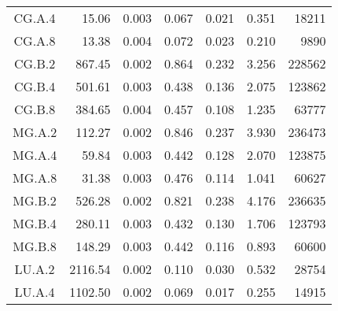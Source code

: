 \begin{longtable}[c]{c*{6}{r}}
  CG.A.4                       & 15.06                        & 0.003                        & 0.067                      & 0.021                        & 0.351 & 18211  \\
  CG.A.8                       & 13.38                        & 0.004                        & 0.072                      & 0.023                        & 0.210 & 9890   \\
  CG.B.2                       & 867.45                       & 0.002                        & 0.864                      & 0.232                        & 3.256 & 228562 \\
  CG.B.4                       & 501.61                       & 0.003                        & 0.438                      & 0.136                        & 2.075 & 123862 \\
  CG.B.8                       & 384.65                       & 0.004                        & 0.457                      & 0.108                        & 1.235 & 63777  \\
  MG.A.2                       & 112.27                       & 0.002                        & 0.846                      & 0.237                        & 3.930 & 236473 \\
  MG.A.4                       & 59.84                        & 0.003                        & 0.442                      & 0.128                        & 2.070 & 123875 \\
  MG.A.8                       & 31.38                        & 0.003                        & 0.476                      & 0.114                        & 1.041 & 60627  \\
  MG.B.2                       & 526.28                       & 0.002                        & 0.821                      & 0.238                        & 4.176 & 236635 \\
  MG.B.4                       & 280.11                       & 0.003                        & 0.432                      & 0.130                        & 1.706 & 123793 \\
  MG.B.8                       & 148.29                       & 0.003                        & 0.442                      & 0.116                        & 0.893 & 60600  \\
  LU.A.2                       & 2116.54                      & 0.002                        & 0.110                      & 0.030                        & 0.532 & 28754  \\
  LU.A.4                       & 1102.50                      & 0.002                        & 0.069                      & 0.017                        & 0.255 & 14915  \\

\end{longtable}
